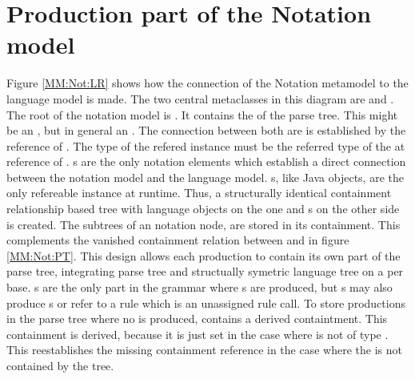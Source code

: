 \section{Production part of the Notation model} \label{sec:MM:Not:Prod}
Figure \ref{MM:Not:LR} shows how the connection of the Notation metamodel to the language model is made. The two central metaclasses in this diagram are  and . The root of the notation model is . It contains the  of the parse tree. This might be an , but in general an . The connection between both are is established by the reference  of .  The type of the refered instance must be the referred type of the  at  reference of . s are the only notation elements which establish a direct connection between the notation model and the language model. s, like Java objects, are the only refereable instance at runtime. Thus, a structurally identical containment relationship based tree with language objects on the one and s on the other side is created. The subtrees of an notation node,  are stored in its  containment. This complements the vanished containment relation between  and  in figure \ref{MM:Not:PT}. This design allows each  production to contain its own part of the parse tree, integrating parse tree and structually symetric language tree on a per  base. s are the only part in the grammar where s are produced, but s may also produce s or refer to a rule which is an unassigned rule call. To store productions in the parse tree where no  is produced,  contains a derived  containtment. This containment is derived, because it is just set in the case where  is not of type . This reestablishes the missing containment reference in the case where the  is not contained by the  tree. \\

